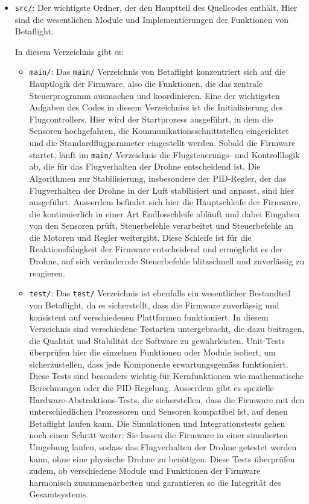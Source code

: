 \begin{itemize}
\item \texttt{src/}: Der wichtigste Ordner, der den Hauptteil des Quellcodes enthält. Hier sind die wesentlichen Module und Implementierungen der Funktionen von Betaflight. 

In diesem Verzeichnis gibt es:
\hspace*{2em}\begin{itemize}\item \texttt{main/}:
Das \texttt{main/} Verzeichnis von Betaflight konzentriert sich auf die Hauptlogik der Firmware, also die Funktionen, die das zentrale Steuerprogramm ausmachen und koordinieren. Eine der wichtigsten Aufgaben des Codes in diesem Verzeichniss ist die Initialisierung des Flugcontrollers. Hier wird der Startprozess ausgeführt, in dem die Sensoren hochgefahren, die Kommunikationsschnittstellen eingerichtet und die Standardflugparameter eingestellt werden. Sobald die Firmware startet, läuft im \texttt{main/} Verzeichnis die Flugsteuerungs- und Kontrolllogik ab, die für das Flugverhalten der Drohne entscheidend ist. Die Algorithmen zur Stabilisierung, insbesondere der PID-Regler, der das Flugverhalten der Drohne in der Luft stabilisiert und anpasst, sind hier ausgeführt. Ausserdem befindet sich hier die Hauptschleife der Firmware, die kontinuierlich in einer Art Endlosschleife abläuft und dabei Eingaben von den Sensoren prüft, Steuerbefehle verarbeitet und Steuerbefehle an die Motoren und Regler weitergibt. Diese Schleife ist für die Reaktionsfähigkeit der Firmware entscheidend und ermöglicht es der Drohne, auf sich verändernde Steuerbefehle blitzschnell und zuverlässig zu reagieren.


\item \texttt{test/}: Das \texttt{test/} Verzeichnis ist ebenfalls ein wesentlicher Bestandteil von Betaflight, da es sicherstellt, dass die Firmware zuverlässig und konsistent auf verschiedenen Plattformen funktioniert. In diesem Verzeichnis sind verschiedene Testarten untergebracht, die dazu beitragen, die Qualität und Stabilität der Software zu gewährleisten. Unit-Tests überprüfen hier die einzelnen Funktionen oder Module isoliert, um sicherzustellen, dass jede Komponente erwartungsgemäss funktioniert. Diese Tests sind besonders wichtig für Kernfunktionen wie mathematische Berechnungen oder die PID-Regelung. Ausserdem gibt es spezielle Hardware-Abstraktions-Tests, die sicherstellen, dass die Firmware mit den unterschiedlichen Prozessoren und Sensoren kompatibel ist, auf denen Betaflight laufen kann. Die Simulationen und Integrationstests gehen noch einen Schritt weiter: Sie lassen die Firmware in einer simulierten Umgebung laufen, sodass das Flugverhalten der Drohne getestet werden kann, ohne eine physische Drohne zu benötigen. Diese Tests überprüfen zudem, ob verschiedene Module und Funktionen der Firmware harmonisch zusammenarbeiten und garantieren so die Integrität des Gesamtsystems.

\end{itemize}
\end{itemize}
	

